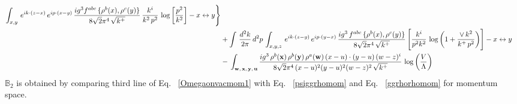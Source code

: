 \documentclass[aps,prd,amsmath,amssymb,nofootinbib]{revtex4-2}
\def\mf#1{\mathbb{#1}}
\numberwithin{equation}{section}
\begin{document}
\begin{align}
\int_{x,y}\, e^{ik\cdot (z-x)}\, e^{ip\cdot (x-y)}\, \frac{ig^{3}f^{abc}\,\{\rho^{b}(x),\rho^{c}(y)\}}{8\sqrt{2}\pi^{4}\, \sqrt{k^{+}}}\, \frac{k^{i}}{k^{2}\,p^{2}}\, \log{\left[\frac{p^{2}}{k^{2}}\right]}-x\leftrightarrow y \Bigg\}\notag \\ & +  \int\, \frac{d^{2}k}{2\pi}\, d^{2}p\, \int_{x,y,z}\,e^{ik\cdot (z-y)}\, e^{ip\cdot (y-x)}\, \frac{ig^{3}\,f^{abc}\,\{\rho^{b}(x),\rho^{c}(y)\}}{8\sqrt{2}\pi^{4}\,\sqrt{k^{+}}}\, \Bigg[\frac{k^{i}}{p^{2}k^{2}}\,\log{\left(1+\frac{\vee\, k^{2}}{k^{+}\, p^{2}}\right)}\Bigg]-x\leftrightarrow y \notag \\ & -\,\int_{\mathbf{w},\, \mathbf{x},\, \mathbf{y},\, \mathbf{u}}\frac{ig^{3}\,\rho^{b}(\mathbf{x})\,\rho^{b}(\mathbf{y})\,\rho^{a}(\mathbf{w})\, (x-u)\cdot (y-u)\,(w-z)^{i}}{8\sqrt{2}\pi^{4}\,(x-u)^{2}(y-u)^{2}(w-z)^{2}\,\sqrt{k^{+}}}\,\log{\left(\frac{V}{\Lambda}\right)}
\end{align}
$\mf{B}_{2}$ is obtained by comparing third line of Eq.~ \eqref{Omegaonvacmom1} with Eq.~ \eqref{psiggrhomom} and Eq.~ \eqref{ggrhorhomom} for momentum space.
\end{document}
